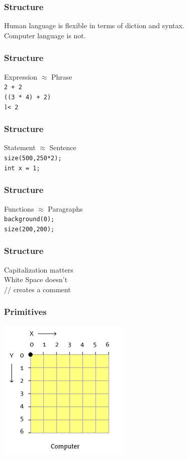 \documentclass[xcolor=dvipsnames]{beamer}
\begin{document}
\begin{frame}
\frametitle{Structure}
Human language is flexible in terms of diction and syntax. \\
\pause
Computer language is not.
\end{frame}

\begin{frame}
\frametitle{Structure}
Expression $\approx$ Phrase \\
\pause
{\tt 2 + 2} \\
{\tt ((3 * 4) + 2)} \\
1{\tt  < 2} \\
\end{frame}

\begin{frame}
\frametitle{Structure}
Statement $\approx$ Sentence \\
\pause
{\tt size(500,250*2);} \\
{\tt int x = 1;} \\
\end{frame}

\begin{frame}
\frametitle{Structure}
Functions $\approx$ Paragraphs \\
\pause
{\tt background(0);} \\
{\tt size(200,200);} \\
\end{frame}

\begin{frame}
\frametitle{Structure}
\begin{center}
Capitalization matters \\
\pause
White Space doesn't \\
\pause
// creates a comment
\end{center}
\end{frame}

\begin{frame}
\frametitle{Primitives}
\begin{center}
\includegraphics[width=0.6\linewidth]{coordinates.jpg}
\end{center}
\end{frame}
\end{document}
